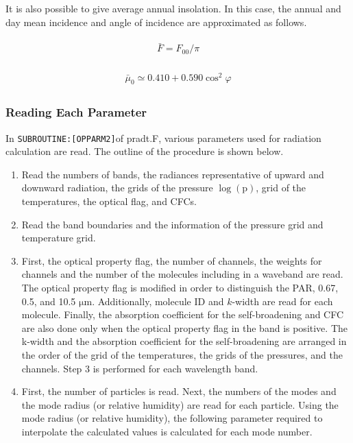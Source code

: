 It is also possible to give average annual insolation. In this case, the
annual and day mean incidence and angle of incidence are approximated as
follows.

\begin{eqnarray}
\begin{array}{c}
\bar{F}=F_{00} / \pi
\end{array}
\end{eqnarray}

\begin{eqnarray}
\begin{array}{c}
\bar{\mu}_{0} \simeq 0.410+0.590 \cos ^{2} \varphi
\end{array}
\end{eqnarray}

\hypertarget{reading-each-parameter}{%
\subsubsection{Reading Each Parameter}\label{reading-each-parameter}}

In \texttt{SUBROUTINE:{[}OPPARM2{]}}of pradt.F, various parameters used
for radiation calculation are read. The outline of the procedure is
shown below.

\begin{enumerate}
\def\labelenumi{\arabic{enumi}.}
\item
  Read the numbers of bands, the radiances representative of upward and
  downward radiation, the grids of the pressure \(\log (\mathrm{p})\),
  grid of the temperatures, the optical flag, and CFCs.
\item
  Read the band boundaries and the information of the pressure grid and
  temperature grid.
\item
  First, the optical property flag, the number of channels, the weights
  for channels and the number of the molecules including in a waveband
  are read. The optical property flag is modified in order to
  distinguish the PAR, 0.67, 0.5, and 10.5 \(\mathrm{{\mu}m}\).
  Additionally, molecule ID and \(k\)-width are read for each molecule.
  Finally, the absorption coefficient for the self-broadening and CFC
  are also done only when the optical property flag in the band is
  positive. The k-width and the absorption coefficient for the
  self-broadening are arranged in the order of the grid of the
  temperatures, the grids of the pressures, and the channels. Step 3 is
  performed for each wavelength band.
\item
  First, the number of particles is read. Next, the numbers of the modes
  and the mode radius (or relative humidity) are read for each particle.
  Using the mode radius (or relative humidity), the following parameter
  required to interpolate the calculated values is calculated for each
  mode number.
\end{enumerate}

